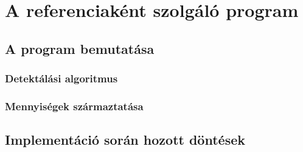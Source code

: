 \chapter{A referenciaként szolgáló program}

\section{A program bemutatása}


\subsection{Detektálási algoritmus}

\subsection{Mennyiségek származtatása}


\section{Implementáció során hozott döntések}















